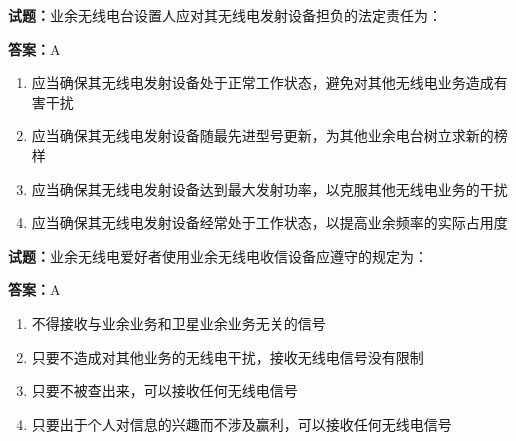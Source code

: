 \documentclass{ctexbook}
\begin{document}




\vspace{1em}

\textbf{试题：}业余无线电台设置人应对其无线电发射设备担负的法定责任为： 

\textbf{答案：}A 

\begin{enumerate}[leftmargin=3em]
  \item 应当确保其无线电发射设备处于正常工作状态，避免对其他无线电业务造成有害干扰 

  \item 应当确保其无线电发射设备随最先进型号更新，为其他业余电台树立求新的榜样 

  \item 应当确保其无线电发射设备达到最大发射功率，以克服其他无线电业务的干扰 

  \item 应当确保其无线电发射设备经常处于工作状态，以提高业余频率的实际占用度 

\end{enumerate}





\vspace{1em}

\textbf{试题：}业余无线电爱好者使用业余无线电收信设备应遵守的规定为： 

\textbf{答案：}A 

\begin{enumerate}[leftmargin=3em]
  \item 不得接收与业余业务和卫星业余业务无关的信号 

  \item 只要不造成对其他业务的无线电干扰，接收无线电信号没有限制 

  \item 只要不被查出来，可以接收任何无线电信号 

  \item 只要出于个人对信息的兴趣而不涉及赢利，可以接收任何无线电信号 

\end{enumerate}





\vspace{1em}
\end{document}
